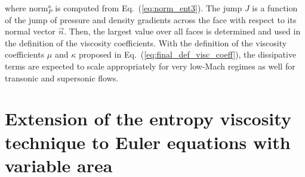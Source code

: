 \documentclass[review,10pt]{elsarticle}
\newcommand{\norm}{\textrm{norm}}
\newcommand{\eqt}[1]{Eq.~(\ref{#1})}                     %
\begin{document}
%
where $\norm_P^\kappa$ is computed from \eqt{eq:norm_ent3}. The jump $J$ is a function of the jump of pressure 
and density gradients across the face with respect to its normal vector $\vec{n}$. Then, the largest value 
over all faces is determined and used in the definition of the viscosity coefficients.
%
With the definition of the viscosity coefficients $\mu$ and $\kappa$ proposed in \eqt{eq:final_def_visc_coeff}, 
the dissipative terms are expected to scale appropriately for very low-Mach regimes as well for transonic
and supersonic flows. 
%
%
\section{Extension of the entropy viscosity technique to Euler equations with variable area} \label{sec:var_area_diss_terms}
\end{document}
